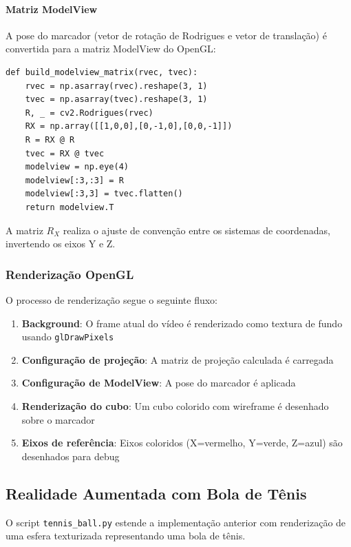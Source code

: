\paragraph{Matriz ModelView}

A pose do marcador (vetor de rotação de Rodrigues e vetor de translação) é convertida para a matriz ModelView do OpenGL:

\begin{lstlisting}[caption=Conversão da matriz ModelView]
def build_modelview_matrix(rvec, tvec):
    rvec = np.asarray(rvec).reshape(3, 1)
    tvec = np.asarray(tvec).reshape(3, 1)
    R, _ = cv2.Rodrigues(rvec)
    RX = np.array([[1,0,0],[0,-1,0],[0,0,-1]])
    R = RX @ R
    tvec = RX @ tvec
    modelview = np.eye(4)
    modelview[:3,:3] = R
    modelview[:3,3] = tvec.flatten()
    return modelview.T
\end{lstlisting}

A matriz $R_X$ realiza o ajuste de convenção entre os sistemas de coordenadas, invertendo os eixos Y e Z.

\subsubsection{Renderização OpenGL}

O processo de renderização segue o seguinte fluxo:

\begin{enumerate}
    \item \textbf{Background}: O frame atual do vídeo é renderizado como textura de fundo usando \texttt{glDrawPixels}
    \item \textbf{Configuração de projeção}: A matriz de projeção calculada é carregada
    \item \textbf{Configuração de ModelView}: A pose do marcador é aplicada
    \item \textbf{Renderização do cubo}: Um cubo colorido com wireframe é desenhado sobre o marcador
    \item \textbf{Eixos de referência}: Eixos coloridos (X=vermelho, Y=verde, Z=azul) são desenhados para debug
\end{enumerate}

\subsection{Realidade Aumentada com Bola de Tênis}

O script \texttt{tennis\_ball.py} estende a implementação anterior com renderização de uma esfera texturizada representando uma bola de tênis.

